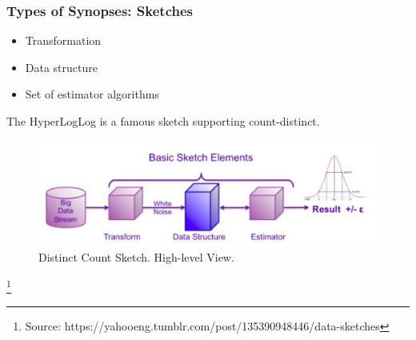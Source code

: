 \documentclass{beamer}
\begin{document}
\begin{frame}
\frametitle{Types of Synopses: Sketches}
\begin{itemize}
\item{Transformation}
\item{Data structure}
\item{Set of estimator algorithms}
\end{itemize}
\vspace{0.1cm}
The HyperLogLog is a famous sketch supporting count-distinct.
\begin{figure}
\includegraphics[scale=0.35]{img/distinct_count_sketches.png}
\caption{Distinct Count Sketch. High-level View.}
\end{figure}
\footnote{\tiny Source: https://yahooeng.tumblr.com/post/135390948446/data-sketches}
\end{frame}

\end{document}

